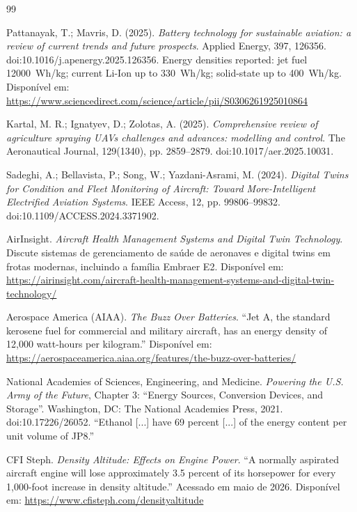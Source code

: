 \documentclass[a4paper,12pt]{article}
\begin{document}
\begin{thebibliography}{99}

    Pattanayak, T.; Mavris, D. (2025). \textit{Battery technology for sustainable aviation: a review of current trends and future prospects}. Applied Energy, 397, 126356. doi:10.1016/j.apenergy.2025.126356. Energy densities reported: jet fuel \SI{12000}{Wh/kg}; current Li-Ion up to \SI{330}{Wh/kg}; solid-state up to \SI{400}{Wh/kg}. Disponível em: \url{https://www.sciencedirect.com/science/article/pii/S0306261925010864}

    Kartal, M. R.; Ignatyev, D.; Zolotas, A. (2025). \textit{Comprehensive review of agriculture spraying UAVs challenges and advances: modelling and control}. The Aeronautical Journal, 129(1340), pp. 2859--2879. doi:10.1017/aer.2025.10031.

    Sadeghi, A.; Bellavista, P.; Song, W.; Yazdani-Asrami, M. (2024). \textit{Digital Twins for Condition and Fleet Monitoring of Aircraft: Toward More-Intelligent Electrified Aviation Systems}. IEEE Access, 12, pp. 99806--99832. doi:10.1109/ACCESS.2024.3371902.

    AirInsight. \textit{Aircraft Health Management Systems and Digital Twin Technology}. Discute sistemas de gerenciamento de saúde de aeronaves e digital twins em frotas modernas, incluindo a família Embraer E2. Disponível em: \url{https://airinsight.com/aircraft-health-management-systems-and-digital-twin-technology/}

    Aerospace America (AIAA). \textit{The Buzz Over Batteries}. ``Jet A, the standard kerosene fuel for commercial and military aircraft, has an energy density of 12,000 watt-hours per kilogram.'' Disponível em: \url{https://aerospaceamerica.aiaa.org/features/the-buzz-over-batteries/}

    National Academies of Sciences, Engineering, and Medicine. \textit{Powering the U.S. Army of the Future}, Chapter 3: ``Energy Sources, Conversion Devices, and Storage''. Washington, DC: The National Academies Press, 2021. doi:10.17226/26052. ``Ethanol [...] have 69 percent [...] of the energy content per unit volume of JP8.''

    CFI Steph. \textit{Density Altitude: Effects on Engine Power}. ``A normally aspirated aircraft engine will lose approximately 3.5 percent of its horsepower for every 1,000-foot increase in density altitude.'' Acessado em maio de 2026. Disponível em: \url{https://www.cfisteph.com/densityaltitude}


\end{thebibliography}
\end{document}
